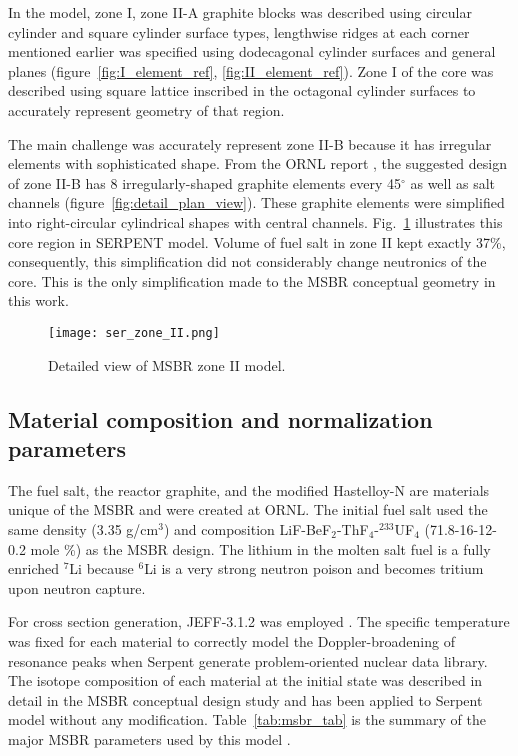 In the model, zone I, zone II-A graphite blocks was described using circular cylinder and square cylinder surface types, lengthwise ridges at each corner mentioned earlier was specified using dodecagonal cylinder surfaces and general planes (figure~\ref{fig:I_element_ref}, \ref{fig:II_element_ref}). Zone I of the core was described using square lattice inscribed in the octagonal cylinder surfaces to accurately represent geometry of that region.

The main challenge was accurately represent zone II-B because it has irregular elements with sophisticated shape. From the \gls{ORNL} report \cite{robertson_conceptual_1971}, the suggested design of zone II-B has 8 irregularly-shaped graphite elements every 45$^\circ$ as well as salt channels (figure~\ref{fig:detail_plan_view}). These graphite elements were simplified into right-circular cylindrical shapes  with central channels. Fig.~\ref{fig:serpent_zoneII} illustrates this core region in SERPENT model. Volume of fuel salt in zone II kept exactly 37\%, consequently, this simplification did not considerably change neutronics of the core. This is the only simplification made to the \gls{MSBR} conceptual geometry in this work. 

\begin{figure}[hbp!] %
  \centering
  \vspace{-0.3em}
  \texttt{[image: ser\_zone\_II.png]}
  \caption{Detailed view of \gls{MSBR} zone II model.}
  \vspace{-0.6em}
  \label{fig:serpent_zoneII}
\end{figure}
\FloatBarrier

\subsection{Material composition and normalization parameters}
The fuel salt, the reactor graphite, and the modified Hastelloy-N are materials 
unique of the \gls{MSBR} and were created at \gls{ORNL}. The initial fuel salt used the same density (3.35 g/cm$^3$) and composition LiF-BeF$_2$-ThF$_4$-$^{233}$UF$_4$ (71.8-16-12-0.2 mole \%) as the \gls{MSBR} design\cite{robertson_conceptual_1971}. The lithium in the molten salt fuel is a fully enriched $^{7}$Li because $^{6}$Li is a very strong neutron poison and becomes tritium upon neutron capture. 

For cross section generation, JEFF-3.1.2 was employed \cite{oecd/nea_data_bank_jeff-3.1.2_2014}. The specific temperature was fixed for each material to correctly model the Doppler-broadening of resonance peaks when Serpent generate problem-oriented nuclear data library. The isotope composition of each material at the initial state was described in detail in the MSBR conceptual design study \cite{robertson_conceptual_1971} and has been applied to Serpent model without any modification. Table~\ref{tab:msbr_tab} is the summary of the major \gls{MSBR} parameters used by this model \cite{robertson_conceptual_1971}. 

